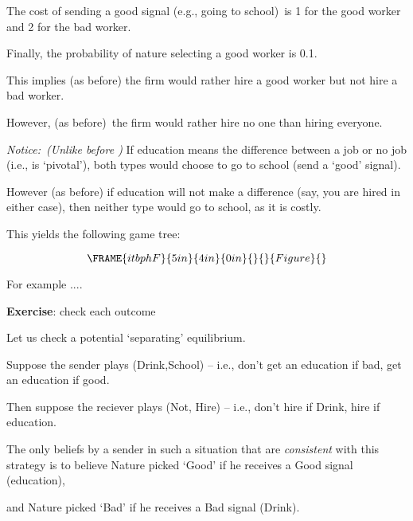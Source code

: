 \documentclass{article}
\begin{document}
The cost of sending a good signal (e.g., going to school)\ is 1 for the good
worker and 2 for the bad worker.

\bigskip

Finally, the probability of nature selecting a good worker is 0.1. \ 

This implies (as before) the firm would rather hire a good worker but not
hire a bad worker.

However, (as before)\ the firm would rather hire no one than hiring everyone.

\bigskip

\textit{Notice:\ (Unlike before ) }If education means the difference between
a job or no job (i.e., is `pivotal'), both types would choose to go to
school (send a `good' signal).

However (as before) if education will not make a difference (say, you are
hired in either case), then neither type would go to school, as it is costly.

\pagebreak

This yields the following game tree:

\begin{equation}
\FRAME{itbphF}{5in}{4in}{0in}{}{}{Figure}{\special{language "Scientific
Word";type "GRAPHIC";maintain-aspect-ratio TRUE;display "USEDEF";valid_file
"T";width 5in;height 4in;depth 0in;original-width 7.2834in;original-height
5.7086in;cropleft "0";croptop "1";cropright "1";cropbottom "0";tempfilename
'JSH1WT0F.wmf';tempfile-properties "XPR";}}
\end{equation}

For example ....

\textbf{Exercise}: check each outcome

\bigskip

Let us check a potential `separating' equilibrium.

Suppose the sender plays (Drink,School) -- i.e., don't get an education if
bad, get an education if good.

Then suppose the reciever plays (Not, Hire) -- i.e., don't hire if Drink,
hire if education.

\bigskip

The only beliefs by a sender in such a situation that are \textit{consistent}
with this strategy is to believe Nature picked `Good' if he receives a Good
signal (education),

and Nature picked `Bad' if he receives a Bad signal (Drink). \ 

\bigskip
\end{document}

